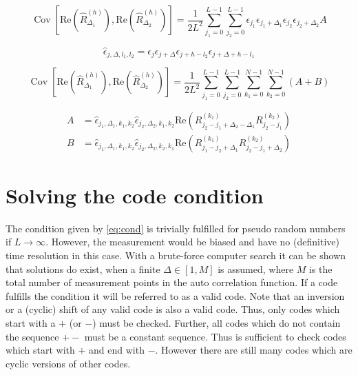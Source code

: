 \documentclass[18pt,a4paper]{extarticle}
\DeclareMathOperator{\Cov}{Cov}
\renewcommand{\Re}{\mathrm{Re}}
\begin{document}
\begin{equation*}
\Cov\left[
\Re\left( \hat{R}^{(h)}_{\Delta_1} \right),
\Re\left( \hat{R}^{(h)}_{\Delta_2} \right)
\right] = \frac{1}{2L^2}\sum^{L-1}_{j_1=0}\sum^{L-1}_{j_2=0}
\epsilon_{j_1} \epsilon_{j_1 + \Delta_1}
\epsilon_{j_2} \epsilon_{j_2 + \Delta_2}
A
\end{equation*}

\begin{equation*}
\hat{\epsilon}_{j, \Delta, l_1, l_2} = \epsilon_j \epsilon_{j + \Delta} \epsilon_{j + h - l_2} \epsilon_{j + \Delta + h - l_1}
\end{equation*}

\begin{equation*}
\Cov\left[
\Re\left( \hat{R}^{(h)}_{\Delta_1} \right),
\Re\left( \hat{R}^{(h)}_{\Delta_2} \right)
\right] = \frac{1}{2L^2}
\sum^{L-1}_{j_1=0}\sum^{L-1}_{j_2=0}
\sum_{k_1=0}^{N-1}\sum_{k_2=0}^{N-1}\left(A+B\right)
\end{equation*}

\begin{align}
A &= \hat{\epsilon}_{j_1, \Delta_1, k_1, k_2}\hat{\epsilon}_{j_2, \Delta_2, k_1, k_2}
\Re\left( R^{(k_1)}_{j_2 - j_1 + \Delta_2 - \Delta_1}R^{(k_2)}_{j_2 - j_1} \right)\\
B &= \hat{\epsilon}_{j_1, \Delta_1, k_1, k_2}\hat{\epsilon}_{j_2, \Delta_2, k_2, k_1}
\Re\left( R^{(k_1)}_{j_1 - j_2 + \Delta_1}R^{(k_2)}_{j_2 - j_1 + \Delta_2} \right)
\end{align}



\section{Solving the code condition}
The condition given by \eqref{eq:cond} is trivially fulfilled for pseudo random numbers if $L \rightarrow \infty$.
However, the measurement would be biased and have no (definitive) time resolution in this case.
With a brute-force computer search it can be shown that solutions do exist, when a finite $\Delta \in [1, M]$ is assumed, where $M$ is the total number of measurement points in the auto correlation function.
If a code fulfills the condition it will be referred to as a valid code.
Note that an inversion or a (cyclic) shift of any valid code is also a valid code.
Thus, only codes which start with a $+$ (or $-$) must be checked.
Further, all codes which do not contain the sequence $+-$ must be a constant sequence.
Thus is sufficient to check codes which start with $+$ and end with $-$.
However there are still many codes which are cyclic versions of other codes.
\end{document}

